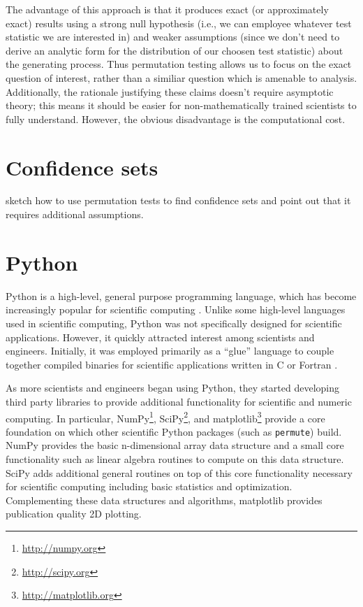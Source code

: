 The advantage of this approach is that it produces exact (or approximately
exact) results using a strong null hypothesis (i.e., we can employee whatever
test statistic we are interested in) and weaker assumptions (since we don't
need to derive an analytic form for the distribution of our choosen test
statistic) about the generating process. Thus permutation testing allows us to
focus on the exact question of interest, rather than a similiar question which
is amenable to analysis.  Additionally, the rationale justifying these claims
doesn't require asymptotic theory; this means it should be easier for
non-mathematically trained scientists to fully understand.  However, the
obvious disadvantage is the computational cost.

\section{Confidence sets}

sketch how to use permutation tests to find confidence sets and point out that it requires additional assumptions.



\section{Python}

Python is a high-level, general purpose programming language, which has become
increasingly popular for scientific computing \cite{millman2011python,
Perez2011}. Unlike some high-level languages used in scientific computing,
Python was not specifically designed for scientific applications.  However, it
quickly attracted interest among scientists and engineers.  Initially, it was
employed primarily as a ``glue'' language to couple together compiled binaries
for scientific applications written in C or Fortran \cite{dubois2007guest}.

As more scientists and engineers began using Python, they started developing
third party libraries to provide additional functionality for scientific
and numeric computing.  In particular, NumPy\footnote{\url{http://numpy.org}},
SciPy\footnote{\url{http://scipy.org}}, and matplotlib\footnote{
\url{http://matplotlib.org}} provide a core foundation on which other
scientific Python packages (such as \texttt{permute}) build. NumPy
provides the basic n-dimensional array data structure and a small core
functionality such as linear algebra routines to compute on this
data structure.  SciPy adds additional general routines on top
of this core functionality necessary for scientific computing including
basic statistics and optimization.  Complementing these data structures
and algorithms, matplotlib provides publication quality 2D plotting.  

